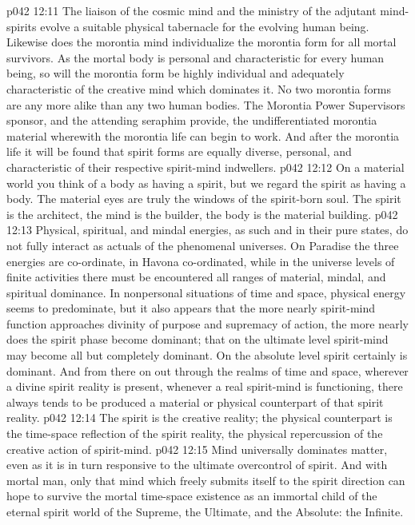 \vs p042 12:11 The liaison of the cosmic mind and the ministry of the adjutant mind\hyp{}spirits evolve a suitable physical tabernacle for the evolving human being. Likewise does the morontia mind individualize the morontia form for all mortal survivors. As the mortal body is personal and characteristic for every human being, so will the morontia form be highly individual and adequately characteristic of the creative mind which dominates it. No two morontia forms are any more alike than any two human bodies. The Morontia Power Supervisors sponsor, and the attending seraphim provide, the undifferentiated morontia material wherewith the morontia life can begin to work. And after the morontia life it will be found that spirit forms are equally diverse, personal, and characteristic of their respective spirit\hyp{}mind indwellers.
\vs p042 12:12 \pc On a material world you think of a body as having a spirit, but we regard the spirit as having a body. The material eyes are truly the windows of the spirit\hyp{}born soul. The spirit is the architect, the mind is the builder, the body is the material building.
\vs p042 12:13 \pc Physical, spiritual, and mindal energies, as such and in their pure states, do not fully interact as actuals of the phenomenal universes. On Paradise the three energies are co\hyp{}ordinate, in Havona co\hyp{}ordinated, while in the universe levels of finite activities there must be encountered all ranges of material, mindal, and spiritual dominance. In nonpersonal situations of time and space, physical energy seems to predominate, but it also appears that the more nearly spirit\hyp{}mind function approaches divinity of purpose and supremacy of action, the more nearly does the spirit phase become dominant; that on the ultimate level spirit\hyp{}mind may become all but completely dominant. On the absolute level spirit certainly is dominant. And from there on out through the realms of time and space, wherever a divine spirit reality is present, whenever a real spirit\hyp{}mind is functioning, there always tends to be produced a material or physical counterpart of that spirit reality.
\vs p042 12:14 The spirit is the creative reality; the physical counterpart is the time\hyp{}space reflection of the spirit reality, the physical repercussion of the creative action of spirit\hyp{}mind.
\vs p042 12:15 Mind universally dominates matter, even as it is in turn responsive to the ultimate overcontrol of spirit. And with mortal man, only that mind which freely submits itself to the spirit direction can hope to survive the mortal time\hyp{}space existence as an immortal child of the eternal spirit world of the Supreme, the Ultimate, and the Absolute: the Infinite.
